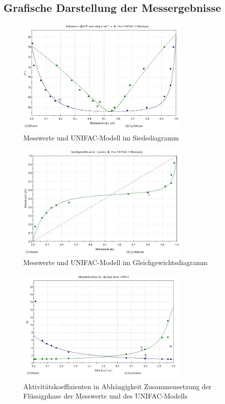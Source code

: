 \subsection*{Grafische Darstellung der Messergebnisse}
\begin{figure}[h!]
	\centering
	\includegraphics[width=0.75\textwidth]{img/Siededia_unifac}
	\caption{Messwerte und \textsc{UNIFAC}-Modell im Siedediagramm}
	\label{fig:siededia_unifac}
\end{figure}
\FloatBarrier

\begin{figure}[h!]
	\centering
	\includegraphics[width=0.75\textwidth]{img/GGW_unifac}
	\caption{Messwerte und \textsc{UNIFAC}-Modell im Gleichgewichtsdiagramm}
	\label{fig:ggw_unifac}
\end{figure}
\FloatBarrier

\begin{figure}[h!]
	\centering
	\includegraphics[width=0.75\textwidth]{img/gamma_unifac}
	\caption{Aktivitätskoeffizienten in Abhängigkeit Zusammensetzung der Flüssigphase der Messwerte und des \textsc{UNIFAC}-Modells}
	\label{fig:gamma_unifac}
\end{figure}
\FloatBarrier

